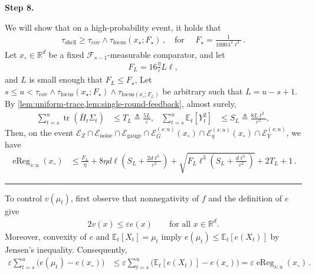 \documentclass{article}
\newcommand{\proofstepinline}[1]{%
    {\normalfont\normalsize\bfseries\color{blue!55!black}Step #1.}\enspace
}
\newcommand{\R}{\mathbb R}
\newcommand{\E}{\mathbb E}
\newcommand{\F}{\mathcal F}
\newcommand{\tr}{\operatorname{tr}}
\newcommand{\1}{\mathbf 1}
\newcommand{\eps}{\varepsilon}
\begin{document}
\proofstepinline{8}
We will show that on a high-probability event, it holds that
\begin{align}
    \tau_{\mathrm{shell}} \geq \tau_{\mathrm{cov}}\wedge\tau_{\mathrm{focus}}(x_\star; F_\star)\,,
    \quad
    \text{for }\quad
    F_\star=\frac{1}{1000\lambda^2\ell^3}\,.
\end{align}
Let $x_{\circ} \in \R^d$ be a fixed $\F_{s-1}$-measurable comparator, and let
\begin{align}
    F_L=16\frac{\eta}{\eps}L\ell,
\end{align}
and $L$ is small enough that $F_L\leq F_\star$,
Let $s \leq u < \tau_{\mathrm{cov}}\wedge\tau_{\mathrm{focus}}(x_\star; F_\star)\wedge\tau_{\mathrm{focus}(x_{\circ}; F_L)}$ be arbitrary such that $L=u-s+1$.
By \cref{lem:uniform-trace,lem:single-round-feedback}, almost surely,
\begin{align}
    \sum_{t=s}^{u}\tr(\bar{H}_t\Sigma_t)
     & \leq T_L\triangleq\frac{5L}{\eps},
     & \sum_{t=s}^{u}\E_t[Y_t^2]
     & \leq S_L\triangleq\frac{8L\ell^2}{\eps^2},
    \label{eq:confinement-local-budgets}
\end{align}
Then, on the event $\mathcal E_Z\cap\mathcal E_{\mathrm{noise}}\cap\mathcal E_{\mathrm{gauge}} \cap \mathcal{E}_{G}^{(s:u)}(x_{\circ}) \cap \mathcal E_{q}^{(s:u)}(x_{\circ}) \cap \mathcal{E}_Y^{(s:u)}$, we have
\begin{align}
    \operatorname{eReg}_{s:u}(x_{\circ})
     & \leq
    \frac{F_L}{\eta }
    +8\eta d\ell\left(S_L+\frac{2d\ell^5}{\eps^2}\right)
    +\sqrt{F_L\ell^3\left(S_L+\frac{d\ell^5}{\eps^2}\right)}
    +
    2T_L
    +1\,.
\end{align}






\vspace{1em}
\hrule
\vspace{1em}
To control $v(\mu_t)$, first observe that nonnegativity of $f$ and the
definition of $e$ give
\begin{align}
    2v(x)\leq\eps e(x)
    \qquad\text{for all }x\in\R^d.
\end{align}
Moreover, convexity of $e$ and $\E_t[X_t]=\mu_t$ imply
$e(\mu_t)\leq\E_t[e(X_t)]$ by Jensen's inequality. Consequently,
\begin{align}
    \eps\sum_{t=s}^{u}\bigl(e(\mu_t)-e(x_{\circ})\bigr)
     & \leq\eps\sum_{t=s}^{u}\bigl(\E_t[e(X_t)]-e(x_{\circ})\bigr)
    =\eps\operatorname{eReg}_{s:u}(x_{\circ})\,.
\end{align}
\end{document}
